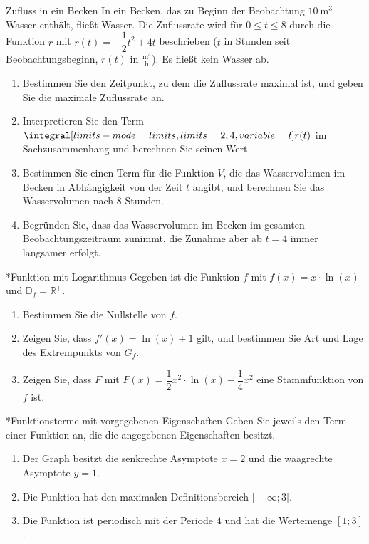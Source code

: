 \begin{uebung}{Zufluss in ein Becken}
In ein Becken, das zu Beginn der Beobachtung $10\ \text{m}^3$ Wasser enthält, fließt Wasser. Die Zuflussrate wird für $0\leq t\leq 8$ durch die Funktion $r$ mit $r(t) = -\dfrac{1}{2}t^2+4t$ beschrieben ($t$ in Stunden seit Beobachtungsbeginn, $r(t)$ in $\frac{\text{m}^3}{\text{h}}$). Es fließt kein Wasser ab.
\begin{enumerate}[label=\alph*)]
  \item Bestimmen Sie den Zeitpunkt, zu dem die Zuflussrate maximal ist, und geben Sie die maximale Zuflussrate an.
  \item Interpretieren Sie den Term $\integral[limits-mode=limits,limits={2, 4}, variable={t}]{r(t)}$ im Sachzusammenhang und berechnen Sie seinen Wert.
  \item Bestimmen Sie einen Term für die Funktion $V$, die das Wasservolumen im Becken in Abhängigkeit von der Zeit $t$ angibt, und berechnen Sie das Wasservolumen nach $8$ Stunden.
  \item Begründen Sie, dass das Wasservolumen im Becken im gesamten Beobachtungszeitraum zunimmt, die Zunahme aber ab $t=4$ immer langsamer erfolgt.
\end{enumerate}
\end{uebung}


\begin{uebung}*{Funktion mit Logarithmus}
Gegeben ist die Funktion $f$ mit $f(x) = x\cdot\ln{(x)}$ und $\mathds{D}_f = \mathds{R}^+$.
\begin{enumerate}[label=\alph*)]
  \item Bestimmen Sie die Nullstelle von $f$.
  \item Zeigen Sie, dass $f'(x) = \ln{(x)}+1$ gilt, und bestimmen Sie Art und Lage des Extrempunkts von $G_f$.
  \item Zeigen Sie, dass $F$ mit $F(x) = \dfrac{1}{2}x^2\cdot\ln{(x)}-\dfrac{1}{4}x^2$ eine Stammfunktion von $f$ ist.
\end{enumerate}
\end{uebung}

\begin{uebung}*{Funktionsterme mit vorgegebenen Eigenschaften}
Geben Sie jeweils den Term einer Funktion an, die die angegebenen Eigenschaften besitzt.
\begin{enumerate}[label=\alph*)]
  \item Der Graph besitzt die senkrechte Asymptote $x=2$ und die waagrechte Asymptote $y=1$.
  \item Die Funktion hat den maximalen Definitionsbereich $]-\infty;3]$.
  \item Die Funktion ist periodisch mit der Periode $4$ und hat die Wertemenge $[1;3]$.
\end{enumerate}
\end{uebung}

